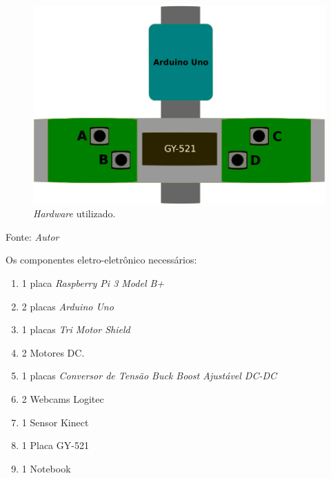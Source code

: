 \begin{figure}[!htb]
  \centering
  \caption{\textit{Hardware} utilizado.}
  \label{fig:hardware_utilizado_controle}
  \includegraphics[width=1\textwidth]{./img/projeto/hardware_utilizado_controle.png}
\end{figure}
Fonte: \textit{Autor}

\pagebreak

Os componentes eletro-eletrônico necessários:
\begin{enumerate}[label=\alph*)]
    \item 1 placa \textit{Raspberry Pi 3 Model B+} 
    \item 2 placas \textit{Arduino Uno}
    \item 1 placas \textit{Tri Motor Shield}
    \item 2 Motores DC.
    \item 1 placas \textit{Conversor de Tensão Buck Boost Ajustável DC-DC}
    \item 2 Webcams Logitec
    \item 1 Sensor Kinect
    \item 1 Placa GY-521
    \item 1 Notebook
\end{enumerate}

\pagebreak

